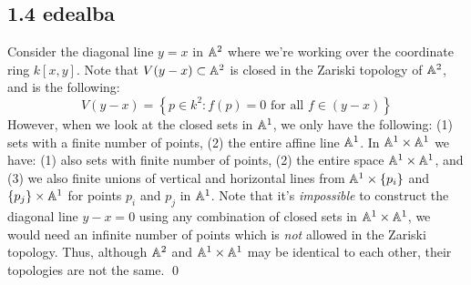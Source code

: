   \subsection*{1.4   {edealba}}

  Consider the diagonal line $y=x$ in $\mathbb{A}^2$ where we're working over the coordinate ring $k[x, y]$. Note that $V(y-x) \subset \mathbb{A}^2$ is closed in the Zariski topology of $\mathbb{A}^2$, and is the following:
$$ V(y-x) = \left\{ p \in k^2 : f(p) = 0 \text{ for all } f \in (y-x) \right\} $$
However, when we look at the closed sets in $\mathbb{A}^1$, we only have the following: (1) sets with a finite number of points, (2) the entire affine line $\mathbb{A}^1$. In $\mathbb{A}^1 \times \mathbb{A}^1$ we have: (1) also sets with finite number of points, (2) the entire space $\mathbb{A}^1 \times \mathbb{A}^1$, and (3) we also finite unions of vertical and horizontal lines from $\mathbb{A}^1 \times \{ p_i \}$ and $\{ p_j \} \times \mathbb{A}^1$ for points $p_i$ and $p_j$ in $\mathbb{A}^1$. Note that it's \emph{impossible} to construct the diagonal line $y-x=0$ using any combination of closed sets in $\mathbb{A}^1 \times \mathbb{A}^1$, we would need an infinite number of points which is \emph{not} allowed in the Zariski topology. Thus, although $\mathbb{A}^2$ and $\mathbb{A}^1 \times \mathbb{A}^1$ may be identical to each other, their topologies are not the same. \qed

